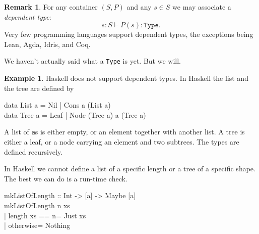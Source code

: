 \documentclass[11pt, a4paper]{article}
\theoremstyle{definition}
\newtheorem{example}[definition]{Example}
\newtheorem{remark}[definition]{Remark}
\theoremstyle{plain}
\begin{document}
\noindent\colorbox{blue!10}{\parbox{\dimexpr\linewidth-2\fboxsep}{%
\begin{remark}\label{rem:dependent-types}
For any container $(S, P)$ and any $s \in S$ we may associate a
\emph{dependent type}:
\[
  s : S \vdash P(s) : \texttt{Type}.
\]
Very few programming languages support dependent types, the exceptions
being Lean, Agda, Idris, and Coq.

We haven't actually said what a \texttt{Type} is yet.  But we will.
\end{remark}%
}}

\begin{example}\label{ex:haskell}
Haskell does not support dependent types.  In Haskell the list
and the tree are defined by
\begin{center}
\colorbox{gray!15}{\begin{minipage}{0.85\linewidth}
\ttfamily
data List a = Nil | Cons a (List a)\\
data Tree a = Leaf | Node (Tree a) a (Tree a)
\end{minipage}}
\end{center}
A list of \texttt{a}s is either empty, or an element together with
another list.  A tree is either a leaf, or a node carrying an
element and two subtrees.  The types are defined recursively.

In Haskell we cannot define a
list of a specific length or a tree of a specific shape.  The best
we can do is a run-time check.
\begin{center}
\colorbox{gray!15}{\begin{minipage}{0.75\linewidth}
\ttfamily
mkListOfLength :: Int -> [a] -> Maybe [a]\\
mkListOfLength n xs\\
\hspace*{1.5em}| length xs == n\hspace*{0.5em}= Just xs\\
\hspace*{1.5em}| otherwise\hspace*{3.5em}= Nothing
\end{minipage}}
\end{center}
\end{example}
\end{document}
